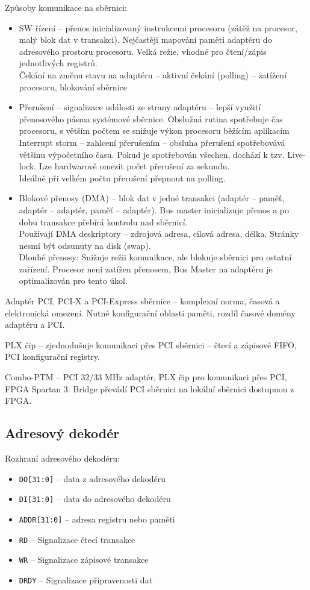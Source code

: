 \documentclass[a4paper, 11pt]{report}
\begin{document}
Způsoby komunikace na sběrnici:
\begin{itemize}
	\item SW řízení -- přenos inicializovaný instrukcemi procesoru (zátěž na procesor, malý blok dat v transakci). Nejčastěji mapování paměti adaptéru do adresového prostoru procesoru. Velká režie, vhodné pro čtení/zápis jednotlivých registrů.\\
	Čekání na změnu stavu na adaptéru -- aktivní čekání (polling) -- zatížení procesoru, blokování sběrnice
	\item Přerušení -- signalizace události ze strany adaptéru -- lepší využití přenosového pásma systémové sběrnice. Obslužná rutina spotřebuje čas procesoru, s větším počtem se snižuje výkon procesoru běžícím aplikacím\\
	Interrupt storm -- zahlcení přerušením -- obsluha přerušení spotřebovává většinu výpočetního času. Pokud  je spotřebován všechen, dochází k tzv. Live-lock. Lze hardwarově omezit počet přerušení za sekundu.\\
	Ideálně při velkém počtu přerušení přepnout na polling.
	\item Blokové přenosy (DMA) -- blok dat v jedné transakci (adaptér -- paměť, adaptér -- adaptér, paměť -- adaptér). Bus master inicializuje přenos a po dobu transakce přebírá kontrolu nad sběrnicí.\\
	Používají DMA deskriptory -- zdrojová adresa, cílová adresa, délka. Stránky nesmí být odsunuty na disk (swap).\\
	Dlouhé přenosy: Snižuje režii komunikace, ale blokuje sběrnici pro ostatní zařízení. Procesor není zatížen přenosem, Bus Master na adaptéru je optimalizován pro tento úkol.
\end{itemize}

Adaptér PCI, PCI-X a PCI-Express sběrnice -- komplexní norma, časová a elektronická omezení. Nutné konfigurační oblasti paměti, rozdíl časové domény adaptéru a PCI.

PLX čip -- zjednodušuje komunikaci přes PCI sběrnici -- čtecí a zápisové FIFO, PCI konfigurační registry.

Combo-PTM -- PCI 32/33 MHz adaptér, PLX čip pro komunikaci přes PCI, FPGA Spartan 3. Bridge převádí PCI sběrnici na lokální sběrnici dostupnou z FPGA.

\subsection{Adresový dekodér}
Rozhraní adresového dekodéru:
\begin{itemize}
	\item \texttt{DO[31:0]} -- data z adresového dekodéru
	\item \texttt{DI[31:0]} -- data do adresového dekodéru
	\item \texttt{ADDR[31:0]} -- adresa registru nebo paměti
	\item \texttt{RD} -- Signalizace čtecí transakce
	\item \texttt{WR} -- Signalizace zápisové transakce
	\item \texttt{DRDY} -- Signalizace připravenosti dat
\end{itemize}
\end{document}
